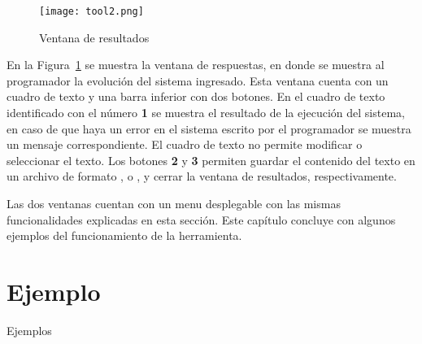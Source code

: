 \begin{figure}[htbp] %
   \centering
   \texttt{[image: tool2.png]} 
   \caption{Ventana de resultados}
   \label{fig:tool2}
\end{figure}

En la Figura~\ref{fig:tool2} se muestra la ventana de respuestas, en donde se muestra al programador la evoluci\'on del sistema ingresado. Esta ventana cuenta con un cuadro de texto y una barra inferior con dos botones. En el cuadro de texto identificado con el n\'umero \textbf{1} se muestra el resultado de la ejecuci\'on del sistema, en caso de que haya un error en el sistema escrito por el programador se muestra un mensaje correspondiente. El cuadro de texto no permite modificar o seleccionar el texto. Los botones \textbf{2} y \textbf{3} permiten guardar el contenido del texto en un archivo de formato ,  o , y cerrar la ventana de resultados, respectivamente.

Las dos ventanas cuentan con un menu desplegable con las mismas funcionalidades explicadas en esta secci\'on. Este cap\'itulo concluye con algunos ejemplos del funcionamiento de la herramienta.

\section{Ejemplo}
\label{example.envir}


Ejemplos
